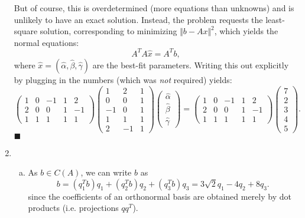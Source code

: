 \documentclass[12pt]{article}
\begin{document}
\begin{enumerate}[1.]
\[    \]
    But of course, this is overdetermined (more equations than unknowns) and is unlikely to have an exact solution.
    Instead, the problem requests the least-square solution, corresponding to minimizing $\Vert b - Ax \Vert^2$, which
    yields the normal equations:
    \[ \boxed{A^T A \hat{x} = A^T b} ,\]
    where $\hat{x} = (\hat{\alpha}, \hat{\beta}, \hat{\gamma})$ are the best-fit parameters.
    Writing this out explicitly by plugging in the numbers (which was \emph{not} required) yields:
    \[
    \boxed{\begin{pmatrix} 
    1 & 0 & -1 & 1 & 2 \\
    2 & 0 & 0 & 1 & -1\\
    1 & 1 & 1 & 1 & 1
    \end{pmatrix} 
    \begin{pmatrix} 
    1 & 2 & 1 \\
    0 & 0 & 1 \\
    -1 & 0 & 1 \\
    1 & 1 & 1 \\
    2 & -1 & 1 
    \end{pmatrix} 
    \begin{pmatrix} \hat{\alpha} \\ \hat{\beta} \\ \hat{\gamma} \end{pmatrix} = \begin{pmatrix} 1 & 0 & -1 & 1 & 2 \\
    2& 0 & 0 & 1 & -1\\
    1 & 1 & 1 & 1 & 1
    \end{pmatrix} \begin{pmatrix} 7 \\ 2 \\ 3 \\ 4 \\ 5 \end{pmatrix}}.
    \]
    \hfill $\blacksquare$
    
    \newpage
    \item \begin{enumerate}[(a)]
        \item As $b \in C(A)$, we can write $b$ as
        \[
        b = (q_1^T b) q_1 +  (q_2^T b) q_2 + (q_3^T b) q_3 =  \boxed{3\sqrt{2} q_1 -4q_2 + 8 q_3}.
        \]
        since the coefficients of an orthonormal basis are obtained merely by dot products (i.e. projections $qq^T$).
        

\end{enumerate}
\end{enumerate}
\end{document}
